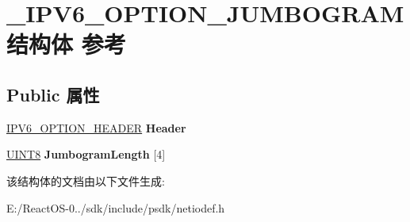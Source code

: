 \hypertarget{struct___i_p_v6___o_p_t_i_o_n___j_u_m_b_o_g_r_a_m}{}\section{\+\_\+\+I\+P\+V6\+\_\+\+O\+P\+T\+I\+O\+N\+\_\+\+J\+U\+M\+B\+O\+G\+R\+A\+M结构体 参考}
\label{struct___i_p_v6___o_p_t_i_o_n___j_u_m_b_o_g_r_a_m}
\subsection*{Public 属性}
\begin{DoxyCompactItemize}
\item 
\mbox{\label{struct___i_p_v6___o_p_t_i_o_n___j_u_m_b_o_g_r_a_m_a288fac06b68a94c4e275ce1462dee506}} 
\hyperlink{struct___i_p_v6___o_p_t_i_o_n___h_e_a_d_e_r}{I\+P\+V6\+\_\+\+O\+P\+T\+I\+O\+N\+\_\+\+H\+E\+A\+D\+ER} {\bfseries Header}
\item 
\mbox{\label{struct___i_p_v6___o_p_t_i_o_n___j_u_m_b_o_g_r_a_m_a389255856d8c6c874d5032369dbc1881}} 
\hyperlink{_processor_bind_8h_ab27e9918b538ce9d8ca692479b375b6a}{U\+I\+N\+T8} {\bfseries Jumbogram\+Length} \mbox{[}4\mbox{]}
\end{DoxyCompactItemize}


该结构体的文档由以下文件生成\+:\begin{DoxyCompactItemize}
\item 
E\+:/\+React\+O\+S-\/0../sdk/include/psdk/netiodef.\+h\end{DoxyCompactItemize}
